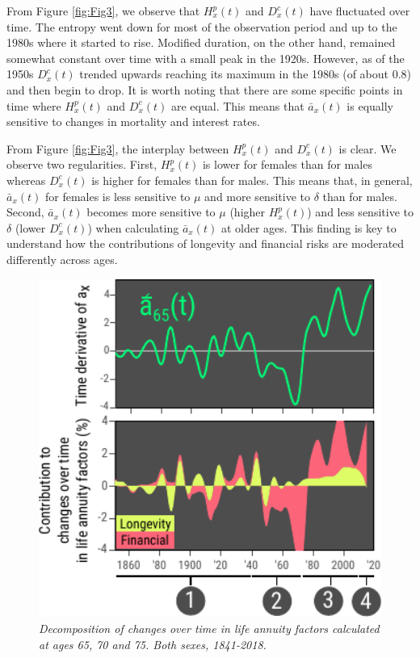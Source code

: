 \documentclass[12pt]{article}
\begin{document}
From Figure \ref{fig:Fig3}, we observe that ${H}^{p}_x(t)$ and ${D}^{c}_x(t)$ have fluctuated over time. The entropy went down for most of the observation period and up to the 1980s where it started to rise. Modified duration, on the other hand, remained somewhat constant over time with a small peak in the 1920s. However, as of the 1950s ${D}^{c}_x(t)$ trended upwards reaching its maximum in the 1980s (of about 0.8) and then begin to drop. It is worth noting that there are some specific points in time where ${H}^{p}_x(t)$ and ${D}^{c}_x(t)$ are equal. This means that $\bar{a}_x(t)$ is equally sensitive to changes in mortality and interest rates.

From Figure \ref{fig:Fig3}, the interplay between ${H}^{p}_x(t)$ and ${D}^{c}_x(t)$ is clear. We observe two regularities. First, ${H}^{p}_x(t)$ is lower for females than for males whereas ${D}^{c}_x(t)$ is higher for females than for males. This means that, in general, $\bar{a}_x(t)$ for females is less sensitive to $\mu$ and more sensitive to $\delta$ than for males. Second, $\bar{a}_x(t)$ becomes more sensitive to $\mu$ (higher ${H}^{p}_x(t)$) and less sensitive to $\delta$ (lower ${D}^{c}_x(t)$) when calculating $\bar{a}_x(t)$ at older ages. This finding is key to understand how the contributions of longevity and financial risks are moderated differently across ages.


\begin{figure}[!ht]
	\centering
	\includegraphics[width=1\textwidth]{Fig/Fig4}
	\caption{\textit{Decomposition of changes over time in life annuity factors calculated at ages 65, 70 and 75. Both sexes, 1841-2018.}}
	\label{fig:Fig4}
\end{figure}
\end{document}
